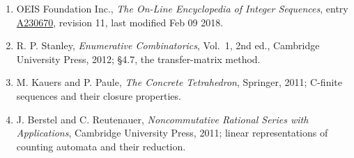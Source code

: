 \documentclass[11pt]{article}
\theoremstyle{definition}
\begin{document}
\begin{enumerate}

\item OEIS Foundation Inc., \emph{The On-Line Encyclopedia of Integer Sequences}, entry \href{https://oeis.org/A230670}{A230670}, revision 11, last modified Feb 09 2018.

\item R. P. Stanley, \emph{Enumerative Combinatorics}, Vol.~1, 2nd ed., Cambridge University Press, 2012; \S4.7, the transfer-matrix method.

\item M. Kauers and P. Paule, \emph{The Concrete Tetrahedron}, Springer, 2011; C-finite sequences and their closure properties.

\item J. Berstel and C. Reutenauer, \emph{Noncommutative Rational Series with Applications}, Cambridge University Press, 2011; linear representations of counting automata and their reduction.

\end{enumerate}
\end{document}
